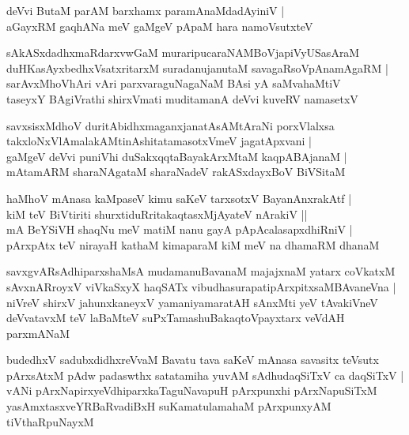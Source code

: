 \documentclass[twoside,12pt,openright]{book}
\newcounter{shloka}[chapter]
\begin{document}
\begin{shloka}%
deVvi ButaM parAM barxhamx paramAnaMdadAyiniV |\\
aGayxRM gaqhANa meV gaMgeV pApaM hara namoVsutxteV 
\end{shloka}

\begin{shloka}%
sAkASxdadhxmaRdarxvwGaM muraripucaraNAMBoVjapiVyUSasAraM \\
duHKasAyxbedhxVsatxritarxM suradanujanutaM savagaRsoVpAnamAgaRM |\\
sarAvxMhoVhAri vAri parxvaraguNagaNaM BAsi yA saMvahaMtiV \\
taseyxY BAgiVrathi shirxVmati muditamanA deVvi kuveRV namasetxV
\end{shloka}

\begin{shloka}%
savxsisxMdhoV duritAbidhxmaganxjanatAsAMtAraNi porxVlalxsa \\
takxloNxVlAmalakAMtinAshitatamasotxVmeV jagatApxvani |\\
gaMgeV deVvi puniVhi duSakxqqtaBayakArxMtaM kaqpABAjanaM |\\
mAtamARM sharaNAgataM sharaNadeV rakASxdayxBoV BiVSitaM 
\end{shloka}

\begin{shloka}%
haMhoV mAnasa kaMpaseV kimu saKeV tarxsotxV BayanAnxrakAtf |\\
kiM teV BiVtiriti shurxtiduRritakaqtasxMjAyateV nArakiV ||\\
mA BeYSiVH shaqNu meV matiM nanu gayA pApAcalasapxdhiRniV |\\
pArxpAtx teV nirayaH kathaM kimaparaM  kiM meV na dhamaRM dhanaM 
\end{shloka}

\begin{shloka}%
savxgvARsAdhiparxshaMsA mudamanuBavanaM majajxnaM yatarx coVkatxM \\
sAvxnARroyxV viVkaSxyX haqSATx vibudhasurapatipArxpitxsaMBAvaneVna |\\
niVreV shirxV jahunxkaneyxV yamaniyamaratAH sAnxMti yeV tAvakiVneV \\
deVvatavxM teV laBaMteV suPxTamashuBakaqtoVpayxtarx veVdAH parxmANaM
\end{shloka}

\begin{shloka}%
budedhxV sadubxdidhxreVvaM Bavatu tava saKeV mAnasa savasitx teVsutx \\
pArxsAtxM pAdw padaswthx satatamiha yuvAM sAdhudaqSiTxV ca daqSiTxV |\\
vANi pArxNapirxyeVdhiparxkaTaguNavapuH pArxpunxhi pArxNapuSiTxM \\
yasAmxtasxveYRBaRvadiBxH suKamatulamahaM pArxpunxyAM tiVthaRpuNayxM 
\end{shloka}
\end{document}
